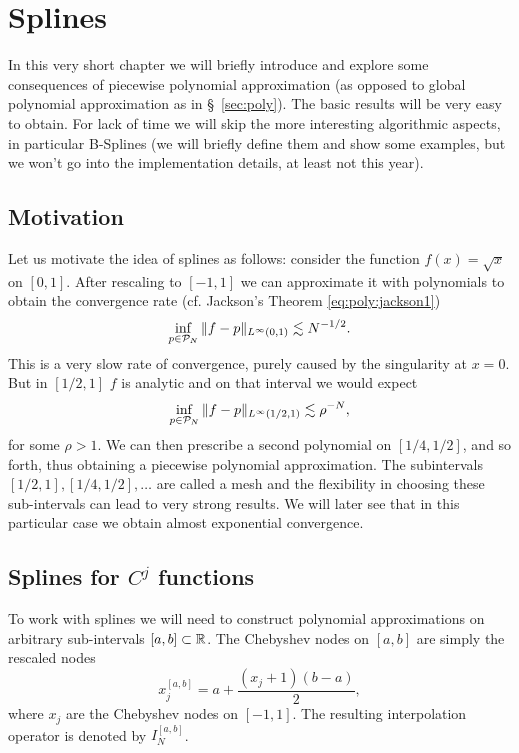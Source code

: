 

\section{Splines}
%
\label{sec:splines}
%
In this very short chapter we will briefly introduce and explore some
consequences of piecewise polynomial approximation (as opposed to global
polynomial approximation as in \S~\ref{sec:poly}). The basic results will be
very easy to obtain. For lack of time we will skip the more interesting
algorithmic aspects, in particular B-Splines (we will briefly define them and
show some examples, but we won't go into the implementation details, at least
not this year).

\subsection{Motivation} 
%
\label{sec:splines:motivation}
%
Let us motivate the idea of splines as follows: consider
the function $f(x) = \sqrt{x}$ on $[0, 1]$. After rescaling to $[-1,1]$ we can
approximate it with polynomials to obtain the convergence rate (cf. Jackson's
Theorem \ref{eq:poly:jackson1}) 
\[
    \inf_{p \in \mathcal{P}_N} \|f - p\|_{L^\infty(0,1)} \lesssim N^{-1/2}.
\]
This is a very slow rate of convergence, purely caused by the singularity at 
$x = 0$. But in $[1/2, 1]$ $f$ is analytic and on that interval we would 
expect 
\[
    \inf_{p \in \mathcal{P}_N} \|f - p\|_{L^\infty(1/2,1)} \lesssim \rho^{-N},
\]
for some $\rho > 1$. We can then prescribe a second polynomial on $[1/4, 1/2]$,
and so forth, thus obtaining a piecewise polynomial approximation. The
subintervals $[1/2,1], [1/4, 1/2], \dots$ are called a mesh and the flexibility
in choosing these sub-intervals can lead to very strong results. We will later
see that in this particular case we obtain almost exponential convergence.


\subsection{Splines for $C^j$ functions}
%
\label{sec:splines:Cj}
%
To work with splines we will need to construct polynomial approximations on
arbitrary sub-intervals $[a,b] \subset \mathbb{R}$. The Chebyshev nodes on $[a,b]$ are
simply the rescaled nodes 
\[
    x_j^{[a,b]}  = a + \frac{(x_j+1)(b-a)}{2},
\]
where $x_j$ are the Chebyshev nodes on $[-1,1]$. The resulting 
interpolation operator is denoted by $I_N^{[a,b]}$. 

